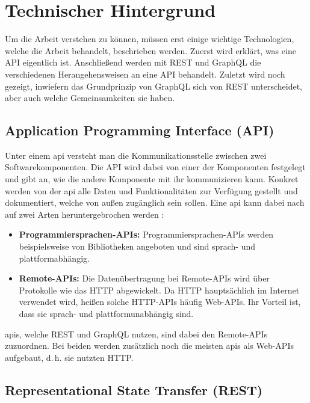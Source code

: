 \chapter{Technischer Hintergrund}\label{technisch}

Um die Arbeit verstehen zu können, müssen erst einige wichtige Technologien, welche die Arbeit behandelt, beschrieben werden. Zuerst wird erklärt, was eine API eigentlich ist. Anschließend werden mit REST und GraphQL die verschiedenen Herangehensweisen an eine API behandelt. Zuletzt wird noch gezeigt, inwiefern das Grundprinzip von GraphQL sich von REST unterscheidet, aber auch welche Gemeinsamkeiten sie haben.

\section{Application Programming Interface (API)}

Unter einem \ac{api} versteht man die Kommunikationsstelle zwischen zwei Softwarekomponenten. Die API wird dabei von einer der Komponenten festgelegt und gibt an, wie die andere Komponente mit ihr kommunizieren kann. Konkret werden von der \ac{api} alle Daten und Funktionalitäten zur Verfügung gestellt und dokumentiert, welche von außen zugänglich sein sollen. Eine \ac{api} kann dabei nach \parencite{Spichale2019} auf zwei Arten heruntergebrochen werden : 

\begin{itemize}
\item \textbf{Programmiersprachen-APIs:} Programmiersprachen-APIs werden beispielsweise von Bibliotheken angeboten und sind sprach- und plattformabhängig.
\item \textbf{Remote-APIs:} Die Datenübertragung bei Remote-APIs wird über Protokolle wie das \ac{HTTP} abgewickelt. Da \ac{HTTP} hauptsächlich im Internet verwendet wird, heißen solche HTTP-APIs häufig Web-APIs. Ihr Vorteil ist, dass sie sprach- und plattformunabhängig sind.
\end{itemize}

\ac{api}s, welche REST und GraphQL nutzen, sind dabei den Remote-APIs zuzuordnen. Bei beiden werden zusätzlich noch die meisten \ac{api}s als Web-APIs aufgebaut, d.\,h. sie nutzten \ac{HTTP}.

\section{Representational State Transfer (REST)}

